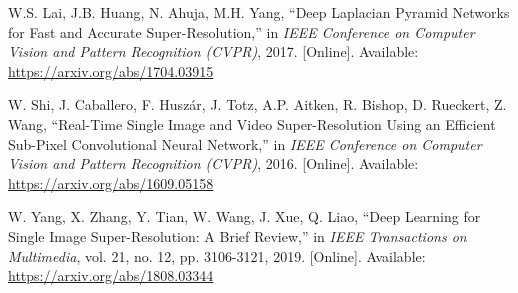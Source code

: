 \documentclass[10pt]{article}
\begin{document}
\begin{thebibliography}{10}
    W.S. Lai, J.B. Huang, N. Ahuja, M.H. Yang, ``Deep Laplacian Pyramid Networks for Fast and Accurate Super-Resolution,'' in \textit{IEEE Conference on Computer Vision and Pattern Recognition (CVPR)}, 2017. [Online]. Available: \url{https://arxiv.org/abs/1704.03915}
    
    W. Shi, J. Caballero, F. Huszár, J. Totz, A.P. Aitken, R. Bishop, D. Rueckert, Z. Wang, ``Real-Time Single Image and Video Super-Resolution Using an Efficient Sub-Pixel Convolutional Neural Network,'' in \textit{IEEE Conference on Computer Vision and Pattern Recognition (CVPR)}, 2016. [Online]. Available: \url{https://arxiv.org/abs/1609.05158}
    
    W. Yang, X. Zhang, Y. Tian, W. Wang, J. Xue, Q. Liao, ``Deep Learning for Single Image Super-Resolution: A Brief Review,'' in \textit{IEEE Transactions on Multimedia}, vol. 21, no. 12, pp. 3106-3121, 2019. [Online]. Available: \url{https://arxiv.org/abs/1808.03344}
    
    \end{thebibliography}
    
\end{document}
